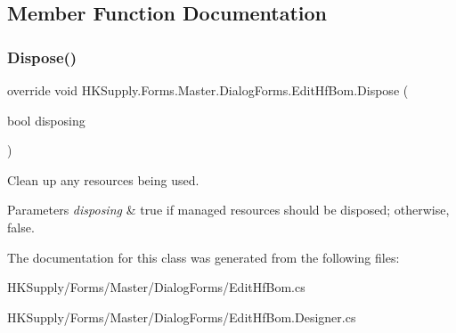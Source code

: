 \subsection{Member Function Documentation}
\mbox{\label{class_h_k_supply_1_1_forms_1_1_master_1_1_dialog_forms_1_1_edit_hf_bom_a56a84e67848b0f496a4b7987f24d7fab}} 
\subsubsection{\texorpdfstring{Dispose()}{Dispose()}}
{\footnotesize\ttfamily override void H\+K\+Supply.\+Forms.\+Master.\+Dialog\+Forms.\+Edit\+Hf\+Bom.\+Dispose (\begin{DoxyParamCaption}\item[{bool}]{disposing }\end{DoxyParamCaption})\hspace{0.3cm}{\ttfamily [protected]}}



Clean up any resources being used. 


\begin{DoxyParams}{Parameters}
{\em disposing} & true if managed resources should be disposed; otherwise, false.\\
\hline
\end{DoxyParams}


The documentation for this class was generated from the following files\+:\begin{DoxyCompactItemize}
\item 
H\+K\+Supply/\+Forms/\+Master/\+Dialog\+Forms/Edit\+Hf\+Bom.\+cs\item 
H\+K\+Supply/\+Forms/\+Master/\+Dialog\+Forms/Edit\+Hf\+Bom.\+Designer.\+cs\end{DoxyCompactItemize}
